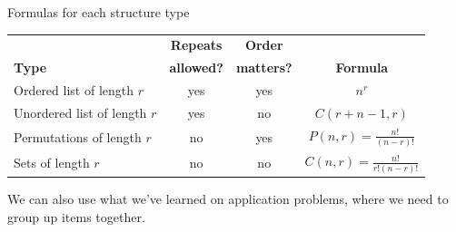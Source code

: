     \begin{intro}{Formulas for each structure type}
	
		\begin{center}
			\begin{tabular}{l | c | c | c }
				\textbf{}
					& \textbf{Repeats}
					& \textbf{Order}
					& \textbf{}
				\\
				\textbf{Type}
					& \textbf{allowed?}
					& \textbf{matters?}
					& \textbf{Formula}
				\\ \hline
				Ordered list of length $r$
					& yes
					& yes
					& $n^{r}$

				\\ \hline
				Unordered list of length $r$
					& yes
					& no
					& $C(r + n - 1, r)$
				\\ \hline
				Permutations of length $r$
					& no
					& yes
					& $P(n,r) = \frac{n!}{(n-r)!}$
				\\ \hline
				Sets of length $r$
					& no
					& no
					& $C(n,r) = \frac{n!}{r!(n-r)!}$
			\end{tabular}
		\end{center}
        
    \end{intro}

    We can also use what we've learned on application problems, where we need to
    group up items together.

    \newpage

